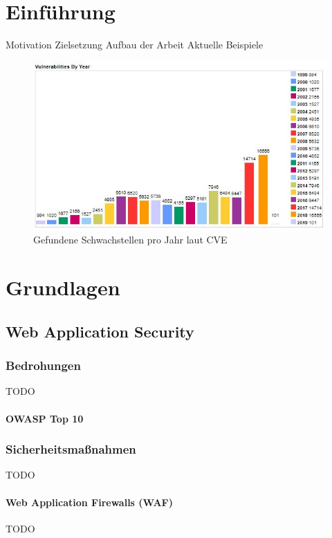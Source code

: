 \documentclass[12pt,oneside,a4paper,parskip]{scrbook}
\begin{document}
\mainmatter

\chapter{Einführung}\label{ch:intro}

Motivation
Zielsetzung
Aufbau der Arbeit
Aktuelle Beispiele
  \begin{figure}[!htb]
    \includegraphics[width=1\textwidth]{Images/VulnByYear}
    \caption[Gefundene Schwachstellen pro Jahr laut CVE]{Gefundene Schwachstellen pro Jahr laut CVE \cite{cve}}
  \end{figure}

\chapter{Grundlagen}
  \section{Web Application Security}
    \subsection{Bedrohungen}
    TODO
      \subsubsection{OWASP Top 10}

    \subsection{Sicherheitsmaßnahmen}
    TODO

    \subsubsection{Web Application Firewalls (WAF)}
    TODO
\end{document}
